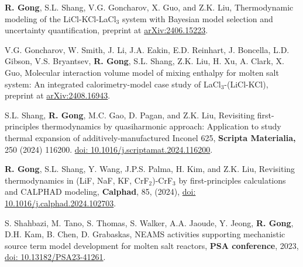 
\begin{etaremune}


\item \textbf{R. Gong}, S.L. Shang, V.G. Goncharov, X. Guo, and Z.K. Liu, Thermodynamic modeling of the LiCl-KCl-LaCl$_3$ system with Bayesian model selection and uncertainty quantification, preprint at
\href{https://arxiv.org/abs/2406.15223}{arXiv:2406.15223}.

\item V.G. Goncharov, W. Smith, J. Li, J.A. Eakin, E.D. Reinhart, J. Boncella, L.D. Gibson, V.S. Bryantsev, \textbf{R. Gong}, S.L. Shang, Z.K. Liu, H. Xu, A. Clark, X. Guo, Molecular interaction volume model of mixing enthalpy for molten salt system: An integrated calorimetry-model case study of LaCl$_3$-(LiCl-KCl), preprint at 
\href{https://arxiv.org/abs/2408.16943}{arXiv:2408.16943}.

\item S.L. Shang, \textbf{R. Gong}, M.C. Gao, D. Pagan, and Z.K. Liu,
Revisiting first-principles thermodynamics by quasiharmonic approach: Application to study thermal expansion of additively-manufactured Inconel 625,
\textbf{Scripta Materialia,} 250 (2024) 116200.
\href{https://doi.org/10.1016/j.scriptamat.2024.116200}{doi: 10.1016/j.scriptamat.2024.116200}.

\item \textbf{R. Gong}, S.L. Shang, Y. Wang, J.P.S. Palma, H. Kim, and Z.K. Liu, 
Revisiting thermodynamics in (LiF, NaF, KF, CrF$_2$)-CrF$_3$ by first-principles calculations and CALPHAD modeling,
\textbf{Calphad}, 85, (2024),
\href{https://doi.org/10.1016/j.calphad.2024.102703}{doi: 10.1016/j.calphad.2024.102703}.

\item S. Shahbazi, M. Tano, S. Thomas, S. Walker, A.A. Jaoude, Y. Jeong, \textbf{R. Gong}, D.H. Kam, B. Chen, D. Grabaskas,
NEAMS activities supporting mechanistic source term model development for molten salt reactors,
\textbf{PSA conference}, 2023,
\href{https://doi.org/10.13182/PSA23-41261}{doi: 10.13182/PSA23-41261}.


\end{etaremune}
